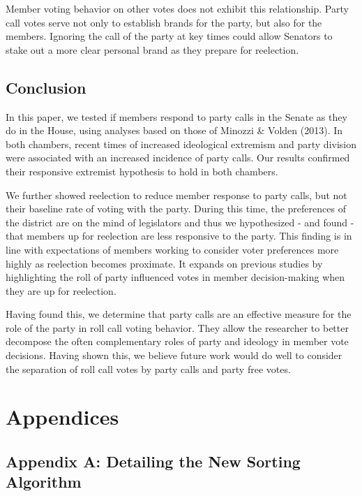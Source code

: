 \documentclass[12pt]{article}
\begin{document}
Member voting behavior on other votes does not exhibit this relationship. Party call votes serve not only to establish brands for the party, but also for the members. Ignoring the call of the party at key times could allow Senators to stake out a more clear personal brand as they prepare for reelection. 

\subsection*{Conclusion}

In this paper, we tested if members respond to party calls in the Senate as they do in the House, using analyses based on those of Minozzi \& Volden (2013). In both chambers, recent times of increased ideological extremism and party division were associated with an increased incidence of party calls. Our results confirmed their responsive extremist hypothesis to hold in both chambers. 

We further showed reelection to reduce member response to party calls, but not their baseline rate of voting with the party. During this time, the preferences of the district are on the mind of legislators and thus we hypothesized - and found - that members up for reelection are less responsive to the party. This finding is in line with expectations of members working to consider voter preferences more highly as reelection becomes proximate. It expands on previous studies by highlighting the roll of party influenced votes in member decision-making when they are up for reelection. 

Having found this, we determine that party calls are an effective measure for the role of the party in roll call voting behavior. They allow the researcher to better decompose the often complementary roles of party and ideology in member vote decisions. Having shown this, we believe future work would do well to consider the separation of roll call votes by party calls and party free votes. 




\pagebreak

\section{Appendices}

\subsection{Appendix A: Detailing the New Sorting Algorithm}
\end{document}
